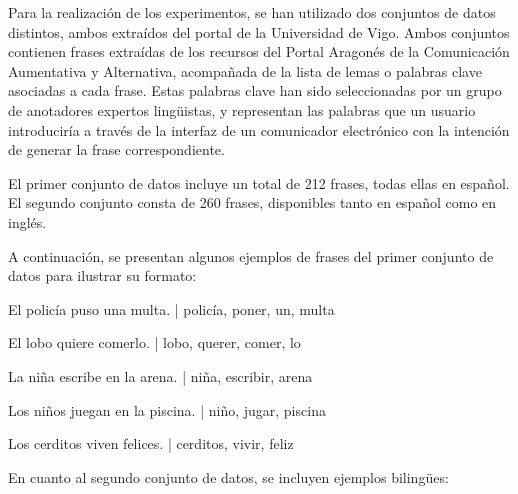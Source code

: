 \documentclass[11pt,spanish,listoffigures,listoftables]{tfgetsinf}
\begin{document}
Para la realización de los experimentos, se han utilizado dos conjuntos de datos distintos, ambos extraídos del portal de la Universidad de Vigo. Ambos conjuntos contienen frases extraídas de los recursos del Portal Aragonés de la Comunicación Aumentativa y Alternativa, acompañada de la lista de lemas o palabras clave asociadas a cada frase. Estas palabras clave han sido seleccionadas por un grupo de anotadores expertos lingüistas, y representan las palabras que un usuario introduciría a través de la interfaz de un comunicador electrónico con la intención de generar la frase correspondiente.

El primer conjunto de datos incluye un total de 212 frases, todas ellas en español. El segundo conjunto consta de 260 frases, disponibles tanto en español como en inglés.

A continuación, se presentan algunos ejemplos de frases del primer conjunto de datos para ilustrar su formato:



\begin{displayquote}

El policía puso una multa. | policía, poner, un, multa

El lobo quiere comerlo. | lobo, querer, comer, lo

La niña escribe en la arena. | niña, escribir, arena

Los niños juegan en la piscina. | niño, jugar, piscina

Los cerditos viven felices. | cerditos, vivir, feliz

\end{displayquote}


En cuanto al segundo conjunto de datos, se incluyen ejemplos bilingües:
\end{document}
